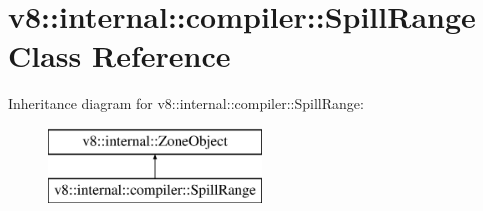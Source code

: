 \hypertarget{classv8_1_1internal_1_1compiler_1_1_spill_range}{}\section{v8\+:\+:internal\+:\+:compiler\+:\+:Spill\+Range Class Reference}
\label{classv8_1_1internal_1_1compiler_1_1_spill_range}
Inheritance diagram for v8\+:\+:internal\+:\+:compiler\+:\+:Spill\+Range\+:\begin{figure}[H]
\begin{center}
\leavevmode
\includegraphics[height=2.000000cm]{classv8_1_1internal_1_1compiler_1_1_spill_range}
\end{center}
\end{figure}
